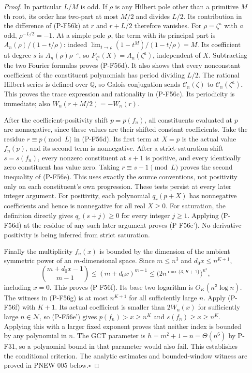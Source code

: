\begin{proof}
In particular $L/M$ is odd. If $\rho$ is any Hilbert pole
other than a primitive $M$th root, its order has two-part
at most $M/2$ and divides $L/2$. Its contribution in the
difference of (P-F56k) at $r$ and $r+L/2$ therefore
vanishes. For $\rho=\zeta^a$ with $a$ odd,
$\rho^{-L/2}=-1$.
At a simple pole $\rho$, the term with its principal part is
$A_n(\rho)/(1-t/\rho)$: indeed
$\lim_{t\to\rho}(1-t^M)/(1-t/\rho)=M$.
Its coefficient at degree $s$ is $A_n(\rho)\rho^{-s}$,
so $P_{\zeta^a}(X)=A_n(\zeta^a)$, independent of $X$.
Subtracting the two Fourier formulas proves (P-F56d).
It also shows that every nonconstant coefficient of the
constituent polynomials has period dividing $L/2$.
The rational Hilbert series is defined over $\mathbb Q$,
so Galois conjugation sends $\mathcal C_n(\zeta)$ to
$\mathcal C_n(\zeta^a)$. This proves the trace expression
and rationality in (P-F56c). Its periodicity is immediate;
also $W_n(r+M/2)=-W_n(r)$.

After the coefficient-positivity shift $p=p(f_n)$, all
constituents evaluated at $p$ are nonnegative, since these
values are their shifted constant coefficients.
Take the residue $r\equiv p\pmod L$ in (P-F56d).
Its first term at $X=p$ is the actual value $f_n(p)$,
and its second term is nonnegative.
After a strict-saturation shift $s=s(f_n)$, every nonzero
constituent at $s+1$ is positive, and every identically
zero constituent has value zero. Taking
$r\equiv s+1\pmod L$ proves the second inequality of
(P-F56e). This uses exactly the source conventions, not
positivity only on each constituent's own progression.
These tests persist at every later integer argument.
For positivity, each polynomial $q_r(p+X)$ has nonnegative
coefficients and hence is nonnegative for all real $X\ge0$.
For saturation, the definition directly gives
$q_r(s+j)\ge0$ for every integer $j\ge1$.
Applying (P-F56d) at the residue of any such later argument
proves (P-F56e'). No derivative positivity is being inferred
from strict saturation.

Finally the multiplicity $f_n(x)$ is bounded by the
dimension of the ambient symmetric power of an
$m$-dimensional space. Since $m\le n^3$ and
$d_0x\le n^{K+1}$,
\[
 \binom{m+d_0x-1}{m-1}
      \le(m+d_0x)^{m-1}
      \le\bigl(2n^{\max\{3,K+1\}}\bigr)^{n^3},
\]
including $x=0$. This proves (P-F56f).
Its base-two logarithm is $O_K(n^3\log n)$.
The witness in (P-F56g) is at most $n^{K+1}$ for all
sufficiently large $n$. Apply (P-F56f) with $K+1$.
Its actual coefficient is smaller than $2W_n(x)$ for
sufficiently large $n\in\mathcal N$, so (P-F56e') gives
$p(f_n)>x\ge n^K$ and $s(f_n)\ge x\ge n^K$.
Applying this with a larger fixed exponent proves that
neither index is bounded by any polynomial in $n$.
The GCT parameter is $h=m^2+1+n=\Theta(n^6)$ by P-F31,
so a polynomial bound in that parameter would also fail.
This establishes the conditional criterion. The analytic estimates
and bounded-window witness are proved in PNEW-005 below.\hfill$\square$
\end{proof}


